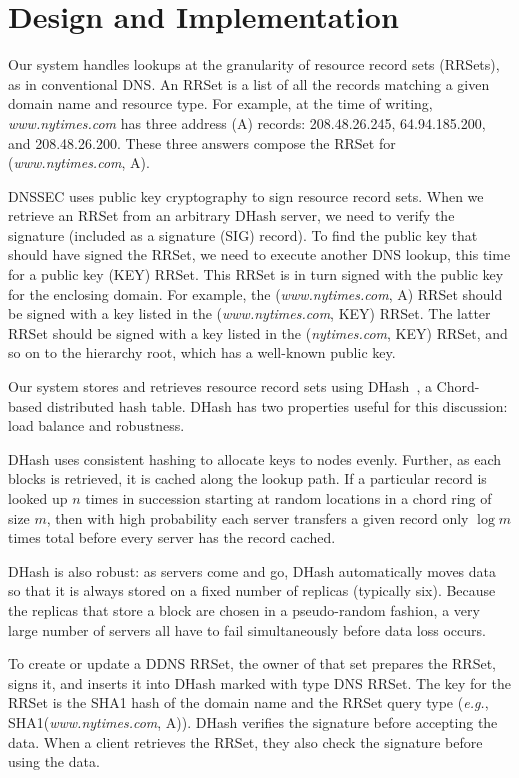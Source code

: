 \section{Design and Implementation}

Our system handles lookups at the granularity of resource record sets (RRSets),
as in conventional DNS.
An RRSet is a list of all the records matching a
given domain name and resource type.
For example, at the time of writing, {\em www.nytimes.com}
has three address (A) records: 208.48.26.245, 64.94.185.200,
and 208.48.26.200.  These three answers compose the RRSet
for ({\em www.nytimes.com}, A).

DNSSEC uses public key cryptography to sign resource record
sets.  When we retrieve an RRSet from an arbitrary
DHash server, we need to verify the signature (included as a 
signature (SIG) record).
To find the public key that should have signed the RRSet,
we need to execute another DNS lookup, 
this time for a public key (KEY) RRSet.
This RRSet is in turn signed with the public key for the
enclosing domain.
For example, the ({\em www.nytimes.com}, A) RRSet should
be signed with a key listed in the ({\em www.nytimes.com}, KEY) RRSet.
The latter RRSet should be signed with a key
listed in the ({\em nytimes.com}, KEY)
RRSet, and so on to the hierarchy root,
which has a well-known public key.

Our system stores and retrieves resource record sets using
DHash~\cite{sfs:sosp01}, a Chord-based distributed hash table.
DHash has two properties useful for this
discussion: load balance and robustness.

DHash uses consistent hashing to allocate keys to nodes evenly.
Further, as each blocks is retrieved, it is cached along
the lookup path.
If a particular record is looked up $n$ times in succession
starting at random locations in a chord ring of size $m$, then with high probability
each server transfers a given record only $\log{m}$ times total
before every server has the record cached.

DHash is also robust: as servers come and go, DHash automatically
moves data so that it is always stored on a fixed number of replicas
(typically six).  Because the replicas that store a block are chosen
in a pseudo-random fashion, a very large number of servers all have to
fail simultaneously before data loss occurs.

To create or update a DDNS RRSet, the owner of that set prepares
the RRSet, signs it, and inserts it into DHash marked with type DNS RRSet.
The key for the RRSet is the SHA1 hash of the domain name and the RRSet query type
({\em e.g.}, SHA1({\em www.nytimes.com}, A)).
DHash verifies the signature before accepting the data.
When a client retrieves the RRSet, they also check the signature before using the data.

